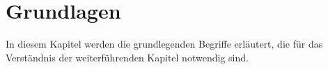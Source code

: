 \section{Grundlagen}
In diesem Kapitel werden die grundlegenden Begriffe erläutert, die für das Verständnis der weiterführenden Kapitel notwendig sind.














